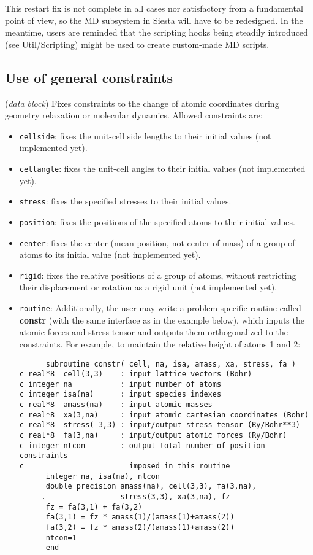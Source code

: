 \documentclass[11pt]{article}
\begin{document}
This restart fix is not complete in all cases nor satisfactory from a
fundamental point of view, so the MD subsystem in Siesta will have to
be redesigned. In the meantime, users are reminded that the scripting
hooks being steadily introduced (see Util/Scripting) might be used to
create custom-made MD scripts.


\subsection{Use of general constraints}
\begin{description}
\itemsep 10pt
\parsep 0pt

\item[{\bf GeometryConstraints}] ({\it data block}) 
Fixes constraints to the change of atomic coordinates during
geometry relaxation or molecular dynamics. Allowed constraints are:
\begin{itemize}
\item {\tt cellside}: fixes the unit-cell side lengths to
their initial values (not implemented yet).
\item {\tt cellangle}: fixes the unit-cell angles to
their initial values (not implemented yet).
\item {\tt stress}: fixes the specified stresses to
their initial values.
\item {\tt position}: fixes the positions of the specified atoms to
their initial values.
\item {\tt center}: fixes the center (mean position, not center of
mass) of a group of atoms to its initial value (not implemented yet).
\item {\tt rigid}: fixes the relative positions of a group of atoms,
without restricting their displacement or rotation as a rigid unit
(not implemented yet).
\item {\tt routine}: Additionally, the user may write a 
problem-specific routine called {\bf constr} (with the same 
interface as in the example below), which inputs the atomic
forces and stress tensor and outputs them orthogonalized to the
constraints. For example, to maintain the relative height of 
atoms 1 and 2:

\begin{verbatim}
      subroutine constr( cell, na, isa, amass, xa, stress, fa )
c real*8  cell(3,3)    : input lattice vectors (Bohr)
c integer na           : input number of atoms
c integer isa(na)      : input species indexes
c real*8  amass(na)    : input atomic masses
c real*8  xa(3,na)     : input atomic cartesian coordinates (Bohr)
c real*8  stress( 3,3) : input/output stress tensor (Ry/Bohr**3)
c real*8  fa(3,na)     : input/output atomic forces (Ry/Bohr)
c integer ntcon        : output total number of position constraints
c                        imposed in this routine
      integer na, isa(na), ntcon
      double precision amass(na), cell(3,3), fa(3,na),
     .                 stress(3,3), xa(3,na), fz
      fz = fa(3,1) + fa(3,2) 
      fa(3,1) = fz * amass(1)/(amass(1)+amass(2))
      fa(3,2) = fz * amass(2)/(amass(1)+amass(2))
      ntcon=1
      end
\end{verbatim}


\end{itemize}
\end{description}
\end{document}
